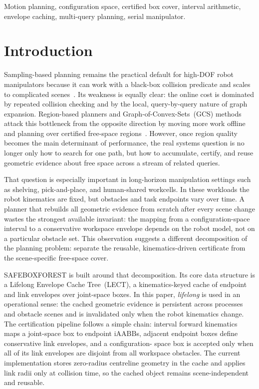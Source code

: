 \documentclass[journal]{IEEEtran}
\DeclareRobustCommand{\textsc}[1]{\textnormal{\MakeUppercase{#1}}}
\newcommand{\iAABB}{\ensuremath{\mathrm{iAABB}}}
\begin{document}
\begin{IEEEkeywords}
Motion planning, configuration space, certified box cover, interval arithmetic,
envelope caching, multi-query planning, serial manipulator.
\end{IEEEkeywords}

\section{Introduction}\label{sec:intro}

Sampling-based planning remains the practical default for high-DOF robot
manipulators because it can work with a black-box collision predicate and scales
to complicated scenes~\cite{lavalle2006planning,lavalle1998rapidly,
kavraki1996probabilistic,karaman2011sampling}. Its weakness is equally clear:
the online cost is dominated by repeated collision checking and by the local,
query-by-query nature of graph expansion. Region-based planners and
Graph-of-Convex-Sets~(GCS) methods attack this bottleneck from the opposite
direction by moving more work offline and planning over certified free-space
regions~\cite{deits2015computing,marcucci2023motion,marcucci2024shortest}.
However, once region quality becomes the main determinant of performance, the
real systems question is no longer only how to search for one path, but how to
accumulate, certify, and reuse geometric evidence about free space across a
stream of related queries.

That question is especially important in long-horizon manipulation settings such
as shelving, pick-and-place, and human-shared workcells. In these workloads the
robot kinematics are fixed, but obstacles and task endpoints vary over time. A
planner that rebuilds all geometric evidence from scratch after every scene
change wastes the strongest available invariant: the mapping from a
configuration-space interval to a conservative workspace envelope depends on the
robot model, not on a particular obstacle set. This observation suggests a
different decomposition of the planning problem: separate the reusable,
kinematics-driven certificate from the scene-specific free-space cover.

\textsc{SafeBoxForest} is built around that decomposition. Its core data
structure is a Lifelong Envelope Cache Tree~(LECT), a kinematics-keyed cache of
endpoint and link envelopes over joint-space boxes. In this paper,
\emph{lifelong} is used in an operational sense: the cached geometric evidence
is persistent across processes and obstacle scenes and is invalidated only when
the robot kinematics change. The certification pipeline follows a simple chain:
interval forward kinematics maps a joint-space box to endpoint \iAABB s,
adjacent endpoint boxes define conservative link envelopes, and a configuration-
space box is accepted only when all of its link envelopes are disjoint from all
workspace obstacles. The current implementation stores zero-radius centreline
geometry in the cache and applies link radii only at collision time, so the
cached object remains scene-independent and reusable.
\end{document}
